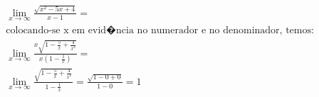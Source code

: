 \begin{ex}
\begin{align}
&\lim_{x\rightarrow \infty} \frac{\sqrt{x^2-5x+4}}{x-1}=\nonumber\\
&\text{colocando-se x em evid�ncia no numerador e no denominador, temos:}\nonumber\\
&\lim_{x\rightarrow \infty} \frac{x\sqrt{1-\frac{5}{x}+\frac{4}{x^2}}}{x(1-\frac{1}{x})}=\nonumber\\
&\lim_{x\rightarrow \infty} \frac{\sqrt{1-\frac{5}{x}+\frac{4}{x^2}}}{1-\frac{1}{x}}=\frac{\sqrt{1-0+0}}{1-0}=1\nonumber
\end{align}
\end{ex}
